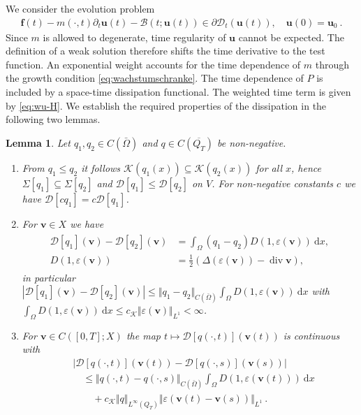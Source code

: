 \documentclass{article}
\newtheorem{lemma}[theorem]{Lemma}
\theoremstyle{definition}
\newcommand{\bfu}{\boldsymbol{u}}
\newcommand{\bfv}{\boldsymbol{v}}
\newcommand{\bff}{\boldsymbol{f}}
\newcommand{\K}{\mathcal{K}}
\newcommand{\D}{\mathcal{D}}
\newcommand{\dd}{\:\mathrm{d}}
\newcommand{\B}{\mathcal{B}}
\renewcommand\div{\operatorname{\mathrm{div}}}
\begin{document}
We consider the evolution problem
\begin{align}\label{eq:time_evolution}
    \bff(t) - m(\cdot,t)\partial_t\bfu(t)-\B(t;\bfu(t)) \in \partial\D_t(\bfu(t)) , \quad \bfu(0) = \bfu_0 \ .
\end{align}
Since $m$ is allowed to degenerate, time regularity of $\bfu$ cannot be expected.
The definition of a weak solution therefore shifts the time derivative
to the test function. An exponential weight accounts for the time dependence of $m$ through the growth condition \eqref{eq:wachstumschranke}.
The time dependence of $P$ is included by a space-time dissipation functional.
The weighted time term is given by \eqref{eq:wu-H}. We establish the required properties of the dissipation in the following two lemmas.

\begin{lemma}\label{lem:prop_time_D}
    Let $q_1,q_2 \in C(\bar \Omega)$ and $q\in C(\overline{Q_T})$ be non-negative.
    \begin{enumerate}
        \item[(a)] From $q_1\leq q_2$ it follows $\K(q_1(x)) \subseteq \K(q_2(x))$ for
        all $x$, hence $\Sigma[q_1]\subseteq\Sigma[q_2]$ and $\D[q_1]\leq \D[q_2]$
        on $V$. For non-negative constants $c$ we have $\D[cq_1] = c \D[q_1]$.
        \item[(b)] For $\bfv\in X$ we have
        \begin{align}
            \begin{split}
            \D[q_1](\bfv) - \D[q_2](\bfv) &= \int_\Omega (q_1-q_2)D(1,\varepsilon (\bfv)) \dd x,\\
            D(1,\varepsilon(\bfv)) &= \frac{1}{2}(\Delta(\varepsilon(\bfv))-\div\bfv),
            \end{split}
            \label{eq:time_D}
        \end{align}
        in particular $|\D[q_1](\bfv)-\D[q_2](\bfv)|\leq \Vert q_1-q_2\Vert_{C(\bar\Omega)}\int_\Omega D(1,\varepsilon(\bfv)) \dd x$ with $\int_\Omega
        D(1,\varepsilon(\bfv))\dd x \leq c_\K \Vert\varepsilon(\bfv)\Vert_{L^1}<\infty$.
        \item[(c)] For $\bfv \in C([0,T];X)$ the map $t\mapsto \D[q(\cdot,t)](\bfv(t))$ is continuous with
        \begin{align*}
            &|\D[q(\cdot, t)](\bfv(t))-\D[q(\cdot,s)](\bfv(s))|\\
            &\quad\leq\Vert q(\cdot,t)-q(\cdot,s)\Vert_{C(\bar\Omega)}\int_\Omega D(1,\varepsilon(\bfv(t))) \dd x \\
            &\qquad + c_\K \Vert q\Vert_{L^\infty(Q_T)}
            \Vert \varepsilon(\bfv(t)-\bfv(s))\Vert_{L^1} \ .
        \end{align*}
    \end{enumerate}
\end{lemma}
\end{document}
